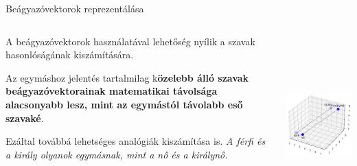 \documentclass[english, aspectratio=169]{beamer}
\begin{document}
\begin{frame}{Beágyazóvektorok reprezentálása}
\begin{columns}
\begin{column}{.5\textwidth}
A beágyazóvektorok használatával lehetőség nyílik a szavak hasonlóságának kiszámítására.\par\smallskip
Az egymáshoz jelentés tartalmilag k\textbf{özelebb álló szavak beágyazóvektorainak matematikai távolsága alacsonyabb lesz, mint az egymástól távolabb eső szavaké}.
\par\smallskip
Ezáltal továbbá lehetséges analógiák kiszámítása is. \emph{A férfi és a király olyanok egymásnak, mint a nő és a királynő.}
\end{column}
\begin{column}{.5\textwidth}
\begin{center}
\includegraphics[width=7cm, height=7cm, keepaspectratio]{images/embedding_vectors_.png}
\end{center}
\end{column}
\end{columns}
\end{frame}
\end{document}
